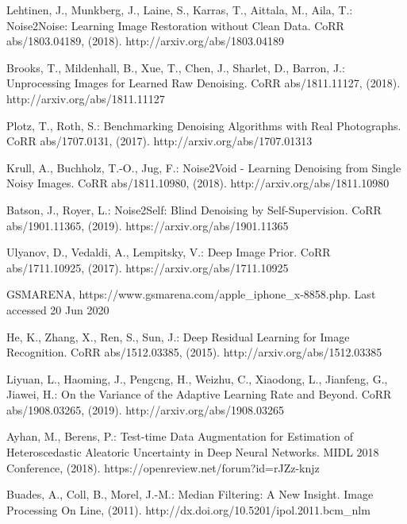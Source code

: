 \documentclass[runningheads]{llncs}
\begin{document}
%
%
% 
% 
%
\begin{thebibliography}{8}
Lehtinen, J., Munkberg, J., Laine, S., Karras, T., Aittala, M., Aila, T.: Noise2Noise: Learning Image Restoration without Clean Data. CoRR abs/1803.04189, (2018). http://arxiv.org/abs/1803.04189
	
Brooks, T., Mildenhall, B., Xue, T., Chen, J., Sharlet, D., Barron, J.: Unprocessing Images for Learned Raw Denoising. CoRR abs/1811.11127, (2018). http://arxiv.org/abs/1811.11127

Plotz, T., Roth, S.: Benchmarking Denoising Algorithms with Real Photographs. CoRR abs/1707.0131, (2017). http://arxiv.org/abs/1707.01313

Krull, A., Buchholz, T.-O., Jug, F.: Noise2Void - Learning Denoising from Single Noisy Images. CoRR abs/1811.10980, (2018). http://arxiv.org/abs/1811.10980

Batson, J., Royer, L.: Noise2Self: Blind Denoising by Self-Supervision. CoRR abs/1901.11365, (2019). https://arxiv.org/abs/1901.11365

Ulyanov, D., Vedaldi, A., Lempitsky, V.: Deep Image Prior. CoRR abs/1711.10925, (2017). https://arxiv.org/abs/1711.10925

GSMARENA, https://www.gsmarena.com/apple\_iphone\_x-8858.php.  Last accessed 20 Jun 2020

He, K., Zhang, X., Ren, S., Sun, J.: Deep Residual Learning for Image Recognition. CoRR abs/1512.03385, (2015). http://arxiv.org/abs/1512.03385

Liyuan, L., Haoming, J., Pengcng, H., Weizhu, C., Xiaodong, L., Jianfeng, G., Jiawei, H.: On the Variance of the Adaptive Learning Rate and Beyond. CoRR abs/1908.03265, (2019). http://arxiv.org/abs/1908.03265

Ayhan, M., Berens, P.: Test-time Data Augmentation for Estimation of Heteroscedastic Aleatoric Uncertainty in Deep Neural Networks. MIDL 2018 Conference, (2018). https://openreview.net/forum?id=rJZz-knjz

Buades, A., Coll, B., Morel, J.-M.: Median Filtering: A New Insight. Image Processing On Line, (2011). http://dx.doi.org/10.5201/ipol.2011.bcm\_nlm
\end{thebibliography}
\end{document}
